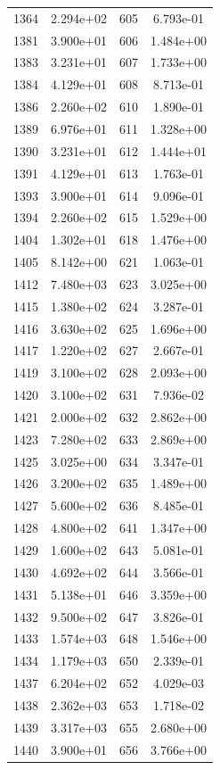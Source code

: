 \documentclass[12pt]{article}
\begin{document}
\begin{longtable}{@{}cccc@{}}
1364 & 2.294e+02 & 605 & 6.793e-01 \\
1381 & 3.900e+01 & 606 & 1.484e+00 \\
1383 & 3.231e+01 & 607 & 1.733e+00 \\
1384 & 4.129e+01 & 608 & 8.713e-01 \\
1386 & 2.260e+02 & 610 & 1.890e-01 \\
1389 & 6.976e+01 & 611 & 1.328e+00 \\
1390 & 3.231e+01 & 612 & 1.444e+01 \\
1391 & 4.129e+01 & 613 & 1.763e-01 \\
1393 & 3.900e+01 & 614 & 9.096e-01 \\
1394 & 2.260e+02 & 615 & 1.529e+00 \\
1404 & 1.302e+01 & 618 & 1.476e+00 \\
1405 & 8.142e+00 & 621 & 1.063e-01 \\
1412 & 7.480e+03 & 623 & 3.025e+00 \\
1415 & 1.380e+02 & 624 & 3.287e-01 \\
1416 & 3.630e+02 & 625 & 1.696e+00 \\
1417 & 1.220e+02 & 627 & 2.667e-01 \\
1419 & 3.100e+02 & 628 & 2.093e+00 \\
1420 & 3.100e+02 & 631 & 7.936e-02 \\
1421 & 2.000e+02 & 632 & 2.862e+00 \\
1423 & 7.280e+02 & 633 & 2.869e+00 \\
1425 & 3.025e+00 & 634 & 3.347e-01 \\
1426 & 3.200e+02 & 635 & 1.489e+00 \\
1427 & 5.600e+02 & 636 & 8.485e-01 \\
1428 & 4.800e+02 & 641 & 1.347e+00 \\
1429 & 1.600e+02 & 643 & 5.081e-01 \\
1430 & 4.692e+02 & 644 & 3.566e-01 \\
1431 & 5.138e+01 & 646 & 3.359e+00 \\
1432 & 9.500e+02 & 647 & 3.826e-01 \\
1433 & 1.574e+03 & 648 & 1.546e+00 \\
1434 & 1.179e+03 & 650 & 2.339e-01 \\
1437 & 6.204e+02 & 652 & 4.029e-03 \\
1438 & 2.362e+03 & 653 & 1.718e-02 \\
1439 & 3.317e+03 & 655 & 2.680e+00 \\
1440 & 3.900e+01 & 656 & 3.766e+00 \\

\end{longtable}
\end{document}
